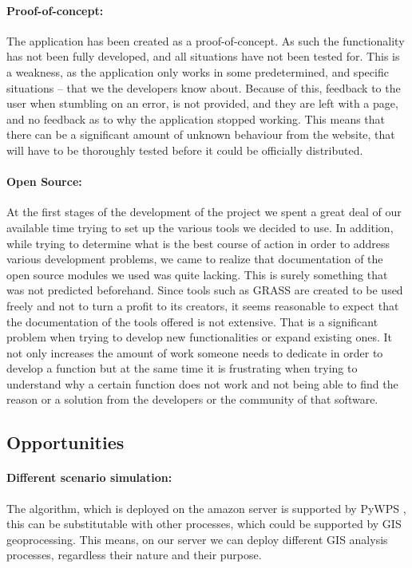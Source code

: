 \paragraph{Proof-of-concept:} The application has been created as a proof-of-concept. As such the functionality has not been fully developed, and all situations have not been tested for. This is a weakness, as the application only works in some predetermined, and specific situations – that we the developers know about. Because of this, feedback to the user when stumbling on an error, is not provided, and they are left with a page, and no feedback as to why the application stopped working.
This means that there can be a significant amount of unknown behaviour from the website, that will have to be thoroughly tested before it could be officially distributed.

\paragraph{Open Source:} At the first stages of the development of the project we spent a great deal of our available time trying to set up the various tools we decided to use.  In addition, while trying to determine what is the best course of action in order to address various development problems, we came to realize that documentation of the open source modules we used was quite lacking. This is surely something that was not predicted beforehand. Since tools such as GRASS are created to be used freely and not to turn a profit to its creators, it seems reasonable to expect that the documentation of the tools offered is not extensive. That is a significant problem when trying to develop new functionalities or expand existing ones. It not only increases the amount of work someone needs to dedicate in order to develop a function but at the same time it is frustrating when trying to understand why a certain function does not work and not being able to find the reason or a solution from the developers or the community of that software.  

\subsection{Opportunities}
\paragraph{Different scenario simulation:} The algorithm, which is deployed on the amazon server is supported by PyWPS , this can be substitutable with other processes, which could be supported by GIS geoprocessing. This means, on our server we can deploy different GIS analysis processes, regardless their nature and their purpose.


